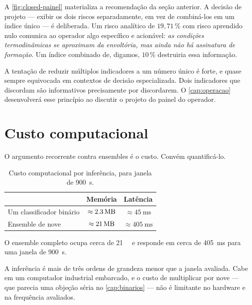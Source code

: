 A \cref{fig:closed-painel} materializa a recomendação da seção anterior. A decisão de
projeto --- exibir os dois riscos separadamente, em vez de combiná-los em um índice
único --- é deliberada. Um risco analítico de $19{,}71\,\%$ com risco aprendido nulo
comunica ao operador algo específico e acionável: \emph{as condições termodinâmicas se
aproximam da envoltória, mas ainda não há assinatura de formação}. Um índice combinado
de, digamos, $10\,\%$ destruiria essa informação.

\begin{destaque}
A tentação de reduzir múltiplos indicadores a um número único é forte, e quase sempre
equivocada em contextos de decisão especializada. Dois indicadores que discordam são
informativos precisamente por discordarem. O \cref{cap:operacao} desenvolverá esse
princípio ao discutir o projeto do painel do operador.
\end{destaque}

\section{Custo computacional}

O argumento recorrente contra ensembles é o custo. Convém quantificá-lo.

\begin{table}[htbp]
\centering
\caption{Custo computacional por inferência, para janela de \SI{900}{\second}.}
\label{tab:closed-custo}
\begin{tabular}{lcc}
\toprule
& \textbf{Memória} & \textbf{Latência} \\
\midrule
Um classificador binário   & $\approx \SI{2,3}{\mega\byte}$ & $\approx \SI{45}{\milli\second}$ \\
Ensemble de nove           & $\approx \SI{21}{\mega\byte}$  & $\approx \SI{405}{\milli\second}$ \\
\bottomrule
\end{tabular}
\end{table}

\begin{resultadochave}
O ensemble completo ocupa cerca de \SI{21}{\mega\byte} e responde em cerca de
\SI{405}{\milli\second} para uma janela de \SI{900}{\second}.
\end{resultadochave}

A inferência é mais de três ordens de grandeza menor que a janela avaliada. Cabe em um computador industrial
embarcado, e o custo de multiplicar por nove --- que parecia uma objeção séria no
\cref{cap:binarios} --- não é limitante no hardware e na frequência avaliados.


